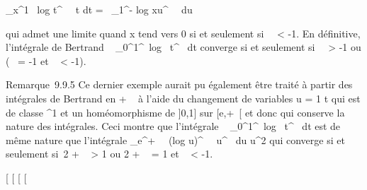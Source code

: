 \documentclass[]{article}
\begin{document}
\int  _x^1\diagupe~
log t^\beta~~
\over t dt =\int ~
_1^- log xu^\beta~~ du

qui admet une limite quand x tend vers 0 si et seulement si~\beta~
< -1. En définitive, l'intégrale de Bertrand
\int ~
_0^1\diagupet^\alpha~log~
t^\beta~ dt converge si et seulement si~\alpha~ >
-1 ou (\alpha~ = -1 et \beta~ < -1).

Remarque~9.9.5 Ce dernier exemple aurait pu également être traité à
partir des intégrales de Bertrand en + \infty~ à l'aide du changement de
variables u = 1 \over t qui est de classe
^1 et un homéomorphisme de ]0,1\diagupe] sur [e,+\infty~[ et
donc qui conserve la nature des intégrales. Ceci montre que l'intégrale
\int ~
_0^1\diagupet^\alpha~log~
t^\beta~ dt est de même nature que l'intégrale
\int  _e^+\infty~~
(log u)^\beta~~ \over
u^\alpha~  du \over u^2 qui
converge si et seulement si~2 + \alpha~ > 1 ou 2 + \alpha~ = 1 et \beta~
< -1.

[
[
[
[
\end{document}
